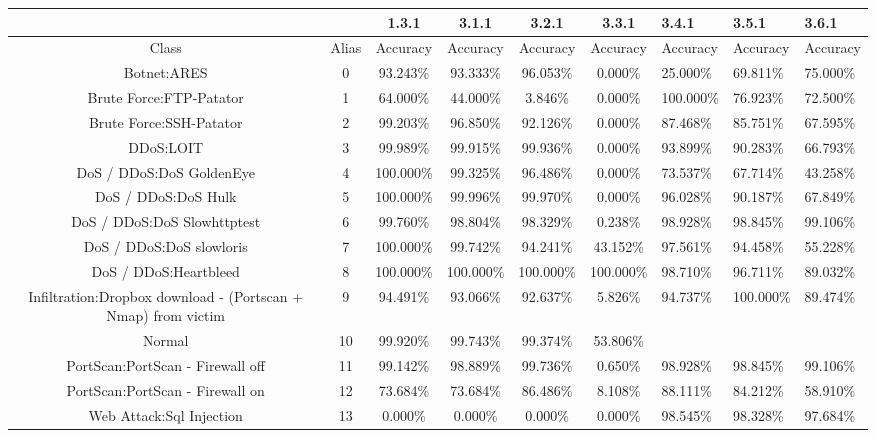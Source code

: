 \begin{table}[htb]
    \centering
    \begin{tabular}{@{}cccccc@{}}
        \toprule
         &  & 1.3.1 & 3.1.1 & 3.2.1 & 3.3.1 & 3.4.1 & 3.5.1 & 3.6.1 \\
        \midrule
        Class &  Alias &  Accuracy &  Accuracy &  Accuracy &  Accuracy &  Accuracy &  Accuracy &  Accuracy \\
        Botnet:ARES &  0 &  93.243\% &  93.333\% &  96.053\% &  0.000\% &  25.000\% &  69.811\% &  75.000\% \\
        Brute Force:FTP-Patator &  1 &  64.000\% &  44.000\% &  3.846\% &  0.000\% &  100.000\% &  76.923\% &  72.500\% \\
        Brute Force:SSH-Patator &  2 &  99.203\% &  96.850\% &  92.126\% &  0.000\% &  87.468\% &  85.751\% &  67.595\% \\
        DDoS:LOIT &  3 &  99.989\% &  99.915\% &  99.936\% &  0.000\% &  93.899\% &  90.283\% &  66.793\% \\
        DoS / DDoS:DoS GoldenEye &  4 &  100.000\% &  99.325\% &  96.486\% &  0.000\% &  73.537\% &  67.714\% &  43.258\% \\
        DoS / DDoS:DoS Hulk &  5 &  100.000\% &  99.996\% &  99.970\% &  0.000\% &  96.028\% &  90.187\% &  67.849\% \\
        DoS / DDoS:DoS Slowhttptest &  6 &  99.760\% &  98.804\% &  98.329\% &  0.238\% &  98.928\% &  98.845\% &  99.106\% \\
        DoS / DDoS:DoS slowloris &  7 &  100.000\% &  99.742\% &  94.241\% &  43.152\% &  97.561\% &  94.458\% &  55.228\% \\
        DoS / DDoS:Heartbleed &  8 &  100.000\% &  100.000\% &  100.000\% &  100.000\% &  98.710\% &  96.711\% &  89.032\% \\
        Infiltration:Dropbox download - (Portscan + Nmap) from victim &  9 &  94.491\% &  93.066\% &  92.637\% &  5.826\% &  94.737\% &  100.000\% &  89.474\% \\
        Normal &  10 &  99.920\% &  99.743\% &  99.374\% &  53.806\% \\
        PortScan:PortScan - Firewall off &  11 &  99.142\% &  98.889\% &  99.736\% &  0.650\% &  98.928\% &  98.845\% &  99.106\% \\
        PortScan:PortScan - Firewall on &  12 &  73.684\% &  73.684\% &  86.486\% &  8.108\% &  88.111\% &  84.212\% &  58.910\% \\
        Web Attack:Sql Injection &  13 &  0.000\% &  0.000\% &  0.000\% &  0.000\% &  98.545\% &  98.328\% &  97.684\% \\

\end{tabular}
\end{table}
